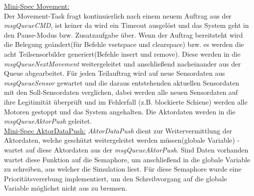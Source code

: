 \underline{Mini-Spec Movement:}\\
Der Movement-Task fragt kontinuierlich nach einem neuem Auftrag aus der \textit{msgQueueCMD}, ist keiner da wird ein Timeout ausgelöst und das System geht in den Pause-Modus bzw. Zusatzaufgabe über. Wenn der Auftrag bereitsteht wird die Belegung geändert(für Befehle vsetspace und clearspace) bzw. es werden die acht Teilsensorbilder generiert(Befehle insert und remove). Diese werden in die \textit{msgQueueNextMovement} weitergeleitet und anschließend nacheinander aus der Queue abgearbeitet. Für jeden Teilauftrag wird auf neue Sensordaten aus \textit{msgQueueSensor} gewartet und die daraus entstehenden aktuellen Sensordaten mit den Soll-Sensordaten verglichen, dabei werden alle neuen Sensordaten auf ihre Legitimität überprüft und im Fehlerfall (z.B. blockierte Schiene) werden alle Motoren gestoppt und das System angehalten. Die Aktordaten werden in die \textit{msgQueueAktorPush} geleitet. \\

\underline{Mini-Spec AktorDataPush:}
\textit{AktorDataPush} dient zur Weitervermittlung der Aktordaten, welche geschützt weitergeleitet werden müssen(globale Variable) - wartet auf diese Aktordaten aus der \textit{msgQueueAktorPush}. Sind Daten vorhanden wartet diese Funktion auf die Semaphore, um anschließend in die globale Variable zu schreiben, aus welcher die Simulation liest. Für diese Semaphore wurde eine Prioritätsvererbung implementiert, um den Schreibvorgang auf die globale Variable möglichst nicht aus zu bremsen. \\
